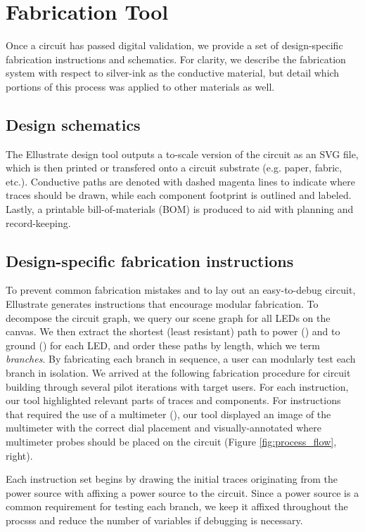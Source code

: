 \documentclass{sigchi}
\begin{document}
\newpage
\section{Fabrication Tool}
    Once a circuit has passed digital validation, we provide a set of design-specific fabrication instructions and schematics. For clarity, we describe the fabrication system with respect to silver-ink as the conductive material, but detail which portions of this process was applied to other materials as well. 

    \subsection{Design schematics}
        The Ellustrate design tool outputs a to-scale version of the circuit as an SVG file, which is then printed or transfered onto a circuit substrate (e.g. paper, fabric, etc.). Conductive paths are denoted with dashed magenta lines to indicate where traces should be drawn, while each component footprint is outlined and labeled. Lastly, a printable bill-of-materials (BOM) is produced to aid with planning and record-keeping.
    \subsection{Design-specific fabrication instructions}
        To prevent common fabrication mistakes and to lay out an easy-to-debug circuit, Ellustrate generates instructions that encourage modular fabrication. To decompose the circuit graph, we query our scene graph for all LEDs on the canvas. We then extract the shortest (least resistant) path to power () and to ground () for each LED, and order these paths by length, which we term \textit{branches}. By fabricating each branch in sequence, a user can modularly test each branch in isolation. We arrived at the following fabrication procedure for circuit building through several pilot iterations with target users. For each instruction, our tool highlighted relevant parts of traces and components. For instructions that required the use of a multimeter (), our tool displayed an image of the multimeter with the correct dial placement and visually-annotated where multimeter probes should be placed on the circuit (Figure \ref{fig:process_flow}, right). 

        Each instruction set begins by drawing the initial traces originating from the power source with affixing a power source to the circuit. Since a power source is a common requirement for testing each branch, we keep it affixed throughout the procsss and reduce the number of variables if debugging is necessary.
        
\end{document}
